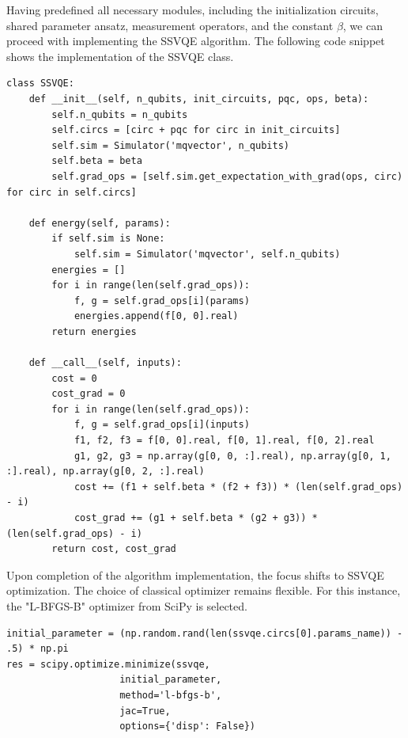 Having predefined all necessary modules, including the initialization circuits, shared parameter ansatz, measurement operators, and the constant $\beta$, we can proceed with implementing the SSVQE algorithm. The following code snippet shows the implementation of the SSVQE class.
\begin{lstlisting}
class SSVQE:
    def __init__(self, n_qubits, init_circuits, pqc, ops, beta):
        self.n_qubits = n_qubits
        self.circs = [circ + pqc for circ in init_circuits]
        self.sim = Simulator('mqvector', n_qubits)
        self.beta = beta
        self.grad_ops = [self.sim.get_expectation_with_grad(ops, circ) for circ in self.circs]

    def energy(self, params):
        if self.sim is None:
            self.sim = Simulator('mqvector', self.n_qubits)
        energies = []
        for i in range(len(self.grad_ops)):
            f, g = self.grad_ops[i](params)
            energies.append(f[0, 0].real)
        return energies

    def __call__(self, inputs):
        cost = 0
        cost_grad = 0
        for i in range(len(self.grad_ops)):
            f, g = self.grad_ops[i](inputs)
            f1, f2, f3 = f[0, 0].real, f[0, 1].real, f[0, 2].real
            g1, g2, g3 = np.array(g[0, 0, :].real), np.array(g[0, 1, :].real), np.array(g[0, 2, :].real)
            cost += (f1 + self.beta * (f2 + f3)) * (len(self.grad_ops) - i)
            cost_grad += (g1 + self.beta * (g2 + g3)) * (len(self.grad_ops) - i)
        return cost, cost_grad
\end{lstlisting}


Upon completion of the algorithm implementation, the focus shifts to SSVQE optimization. The choice of classical optimizer remains flexible. For this instance, the "L-BFGS-B" optimizer from SciPy is selected.


\begin{lstlisting}
initial_parameter = (np.random.rand(len(ssvqe.circs[0].params_name)) - .5) * np.pi
res = scipy.optimize.minimize(ssvqe,
                    initial_parameter,
                    method='l-bfgs-b',
                    jac=True,
                    options={'disp': False})
\end{lstlisting}

